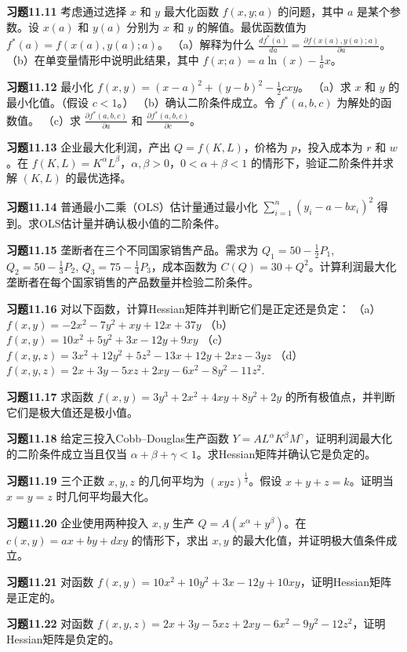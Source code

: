 \begin{translation}
\textbf{习题11.11} 考虑通过选择 $x$ 和 $y$ 最大化函数 $f(x, y; a)$ 的问题，其中 $a$ 是某个参数。设 $x(a)$ 和 $y(a)$ 分别为 $x$ 和 $y$ 的解值。最优函数值为 $f^*(a) = f(x(a), y(a); a)$。
（a）解释为什么 $\frac{df^*(a)}{da} = \frac{\partial f(x(a), y(a); a)}{\partial a}$。
（b）在单变量情形中说明此结果，其中 $f(x; a) = a\ln(x) - \frac{1}{a}x$。

\textbf{习题11.12} 最小化 $f(x, y) = (x - a)^2 + (y - b)^2 - \frac{1}{2}cxy$。
（a）求 $x$ 和 $y$ 的最小化值。（假设 $c < 1$。）
（b）确认二阶条件成立。令 $f^*(a, b, c)$ 为解处的函数值。
（c）求 $\frac{\partial f^*(a,b,c)}{\partial a}$ 和 $\frac{\partial f^*(a,b,c)}{\partial c}$。

\textbf{习题11.13} 企业最大化利润，产出 $Q = f(K, L)$，价格为 $p$，投入成本为 $r$ 和 $w$。在 $f(K, L) = K^\alpha L^\beta$，$\alpha, \beta > 0$，$0 < \alpha + \beta < 1$ 的情形下，验证二阶条件并求解 $(K, L)$ 的最优选择。

\textbf{习题11.14} 普通最小二乘（OLS）估计量通过最小化 $\sum_{i=1}^n (y_i - a - b x_i)^2$ 得到。求OLS估计量并确认极小值的二阶条件。

\textbf{习题11.15} 垄断者在三个不同国家销售产品。需求为 $Q_1 = 50 - \frac{1}{2}P_1$, $Q_2 = 50 - \frac{1}{3}P_2$, $Q_3 = 75 - \frac{1}{4}P_3$，成本函数为 $C(Q) = 30 + Q^2$。计算利润最大化垄断者在每个国家销售的产品数量并检验二阶条件。

\textbf{习题11.16} 对以下函数，计算Hessian矩阵并判断它们是正定还是负定：
（a）$f(x, y) = -2x^2 - 7y^2 + xy + 12x + 37y$
（b）$f(x, y) = 10x^2 + 5y^2 + 3x - 12y + 9xy$
（c）$f(x, y, z) = 3x^2 + 12y^2 + 5z^2 - 13x + 12y + 2xz - 3yz$
（d）$f(x, y, z) = 2x + 3y - 5xz + 2xy - 6x^2 - 8y^2 - 11z^2$.

\textbf{习题11.17} 求函数 $f(x, y) = 3y^3 + 2x^2 + 4xy + 8y^2 + 2y$ 的所有极值点，并判断它们是极大值还是极小值。

\textbf{习题11.18} 给定三投入Cobb--Douglas生产函数 $Y = A L^\alpha K^\beta M^\gamma$，证明利润最大化的二阶条件成立当且仅当 $\alpha + \beta + \gamma < 1$。求Hessian矩阵并确认它是负定的。

\textbf{习题11.19} 三个正数 $x, y, z$ 的几何平均为 $(xyz)^{\frac{1}{3}}$。假设 $x + y + z = k$。证明当 $x = y = z$ 时几何平均最大化。

\textbf{习题11.20} 企业使用两种投入 $x, y$ 生产 $Q = A(x^\alpha + y^\beta)$。在 $c(x, y) = ax + by + dxy$ 的情形下，求出 $x, y$ 的最大化值，并证明极大值条件成立。

\textbf{习题11.21} 对函数 $f(x, y) = 10x^2 + 10y^2 + 3x - 12y + 10xy$，证明Hessian矩阵是正定的。

\textbf{习题11.22} 对函数 $f(x, y, z) = 2x + 3y - 5xz + 2xy - 6x^2 - 9y^2 - 12z^2$，证明Hessian矩阵是负定的。
\end{translation}

